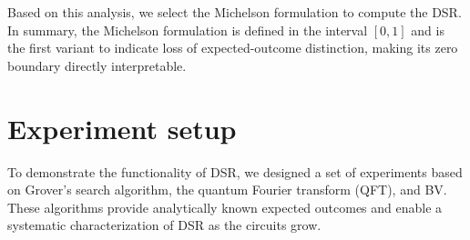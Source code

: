 \documentclass[10pt,conference]{IEEEtran}
\begin{document}
Based on this analysis, we select the Michelson formulation to compute the DSR. In summary, the Michelson formulation is defined in the interval $[0,1]$ and is the first variant to indicate loss of expected-outcome distinction, making its zero boundary directly interpretable.







\section{Experiment setup}
\label{subsec:experiment}

To demonstrate the functionality of DSR, we designed a set of experiments based on Grover’s search algorithm, the quantum Fourier transform (QFT), and BV. These algorithms provide analytically known expected outcomes and enable a systematic characterization of DSR as the circuits grow.
\end{document}
